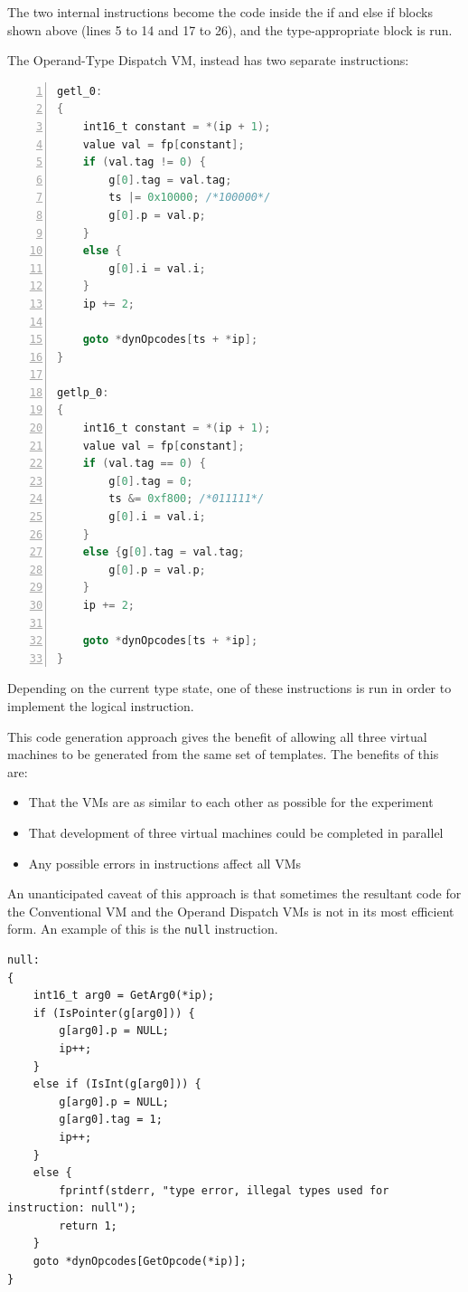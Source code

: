 \documentclass[english,a4paper,12pt]{report}
\begin{document}
The two internal instructions become the code inside the if and else
if blocks shown above (lines 5 to 14 and 17 to 26), and the
type-appropriate block is run.

The Operand-Type Dispatch VM, instead has two separate instructions:
\begin{lstlisting}[language=C,numbers=left,frame=single]
getl_0:
{
    int16_t constant = *(ip + 1);
    value val = fp[constant];
    if (val.tag != 0) {
        g[0].tag = val.tag;
        ts |= 0x10000; /*100000*/
        g[0].p = val.p;
    }
    else {
        g[0].i = val.i;
    }
    ip += 2;

    goto *dynOpcodes[ts + *ip];
}

getlp_0:
{
    int16_t constant = *(ip + 1);
    value val = fp[constant];
    if (val.tag == 0) {
        g[0].tag = 0;
        ts &= 0xf800; /*011111*/
        g[0].i = val.i;
    }
    else {g[0].tag = val.tag;
        g[0].p = val.p;
    }
    ip += 2;

    goto *dynOpcodes[ts + *ip];
}
\end{lstlisting}

Depending on the current type state, one of these instructions is run
in order to implement the logical instruction.

This code generation approach gives the benefit of allowing all three
virtual machines to be generated from the same set of templates. The
benefits of this are:
\begin{itemize}
\item That the VMs are as similar to each other as possible for the
  experiment
\item That development of three virtual machines could be completed in
  parallel
\item Any possible errors in instructions affect all VMs
\end{itemize}

An unanticipated caveat of this approach is that sometimes the
resultant code for the Conventional VM and the Operand Dispatch VMs is
not in its most efficient form. An example of this is the \verb|null|
instruction.

\begin{lstlisting}
null:
{
    int16_t arg0 = GetArg0(*ip);
    if (IsPointer(g[arg0])) {
        g[arg0].p = NULL;
        ip++;
    }
    else if (IsInt(g[arg0])) {
        g[arg0].p = NULL;
        g[arg0].tag = 1;
        ip++;
    }
    else {
        fprintf(stderr, "type error, illegal types used for instruction: null");
        return 1;
    }
    goto *dynOpcodes[GetOpcode(*ip)];
}
\end{lstlisting}
\end{document}
